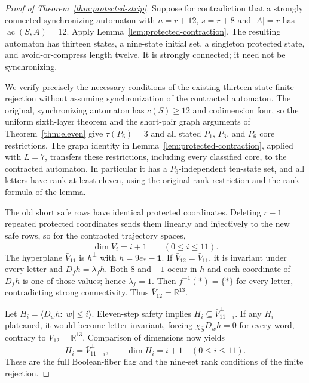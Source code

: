 \documentclass[10pt]{article}
\newcommand{\ac}{\operatorname{ac}}
\begin{document}
\begin{proof}[Proof of Theorem~\ref{thm:protected-strip}]
Suppose for contradiction that a strongly connected synchronizing
automaton with $n=r+12$, $s=r+8$ and $|A|=r$ has
$\ac(S,A)=12$. Apply Lemma~\ref{lem:protected-contraction}.
The resulting automaton has thirteen states, a nine-state initial
set, a singleton protected state, and avoid-or-compress length twelve.
It is strongly connected; it need not be synchronizing.

We verify precisely the necessary conditions of the existing
thirteen-state finite rejection without assuming synchronization
of the contracted automaton. The original, synchronizing
automaton has $c(S)\ge12$ and codimension four, so the uniform
sixth-layer theorem and the short-pair graph arguments of
Theorem~\ref{thm:eleven} give $\tau(P_6)=3$ and all stated
$P_1$, $P_3$, and $P_6$ core restrictions. The graph identity
in Lemma~\ref{lem:protected-contraction}, applied with $L=7$,
transfers these restrictions, including every classified core,
to the contracted automaton. In particular it has a
$P_6$-independent ten-state set, and all letters have rank
at least eleven, using the original rank restriction and
the rank formula of the lemma.

The old short safe rows have identical protected coordinates.
Deleting $r-1$ repeated protected coordinates sends them
linearly and injectively to the new safe rows, so for the
contracted trajectory spaces,
\[
 \dim\bar V_i=i+1\qquad(0\le i\le11).
\]
The hyperplane $\bar V_{11}$ is $h^\perp$ with
$h=9e_*-\mathbf1$. If $\bar V_{12}=\bar V_{11}$, it is
invariant under every letter and $D_fh=\lambda_fh$.
Both $8$ and $-1$ occur in $h$ and each coordinate of
$D_fh$ is one of those values; hence $\lambda_f=1$.
Then $f^{-1}(*)=\{*\}$ for every letter, contradicting
strong connectivity. Thus $\bar V_{12}=\mathbb R^{13}$.

Let $H_i=\langle D_wh:|w|\le i\rangle$.
Eleven-step safety implies $H_i\subseteq\bar V_{11-i}^\perp$.
If any $H_i$ plateaued, it would become letter-invariant,
forcing $\chi_{\bar S}D_wh=0$ for every word, contrary to
$\bar V_{12}=\mathbb R^{13}$.
Comparison of dimensions now yields
\[
 H_i=\bar V_{11-i}^\perp,\qquad
 \dim H_i=i+1\quad(0\le i\le11).
\]
These are the full Boolean-fiber flag and the nine-set
rank conditions of the finite rejection.


\end{proof}
\end{document}
